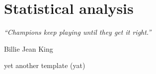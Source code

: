 \chapter{Statistical analysis}
\label{ch:statistical_analysis}
\epigraph{\emph{“Champions keep playing until they get it right.”}}{Billie Jean King}

yet another template (yat)